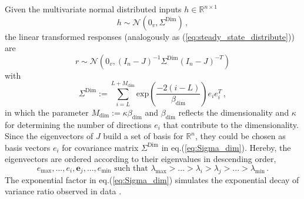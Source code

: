 \documentclass[11pt]{article}
\begin{document}
	Given the multivariate normal distributed inputs $h \in \mathbb{R}^{n \times 1}$
		\begin{equation} \label{eq:input_distribution_dimensionality}
			h \sim \mathcal{N}(0_v, \Sigma^{\text{Dim}}) \, ,
		\end{equation}
	the linear transformed responses (analogously as (\ref{eq:steady_state_distribute})) are
		\begin{equation} \label{eq:response_distribution_dimensionality}
			r \sim \mathcal{N}(0_v, (I_n - J)^{-1} \Sigma^{\text{Dim}} (I_n - J)^{-T})
		\end{equation}
	with 
		\begin{equation} \label{eq:Sigma_dim}
			\Sigma^{\text{Dim}} := \sum_{i=L}^{L+M_{\text{dim}}} \text{exp}\left(\frac{-2(i-L)}{\beta_{\text{dim}}}\right) e_i e_i^T \, , 
		\end{equation}
	in which the parameter $M_{\text{dim}} := \kappa \beta_{\text{dim}}$ and $\beta_{\text{dim}}$ reflects the dimensionality \cite{tragenap2023nature} and $\kappa$ for determining the number of directions $e_i$ that contribute to the dimensionality. Since the eigenvectors of $J$ build a set of basis for $\mathbb{R}^n$, they could be chosen as basis vectors $e_i$ for covariance matrix $\Sigma^{\text{Dim}}$ in eq.(\ref{eq:Sigma_dim}). Hereby, the eigenvectors are ordered according to their eigenvalues in descending order, 
		\begin{equation} 
			e_{\text{max}}, ..., e_i, \mathbf{e}_j, ..., e_{\text{min}} \, \, \text{such that} \, \, 	\lambda_{\text{max}} > ...> \lambda_i > \lambda_j > ... > \lambda_{\text{min}} \, .
		\end{equation}
	The exponential factor in eq.(\ref{eq:Sigma_dim}) simulates the exponential decay of variance ratio observed in data \cite{tragenap2023nature}. 
	
\end{document}
